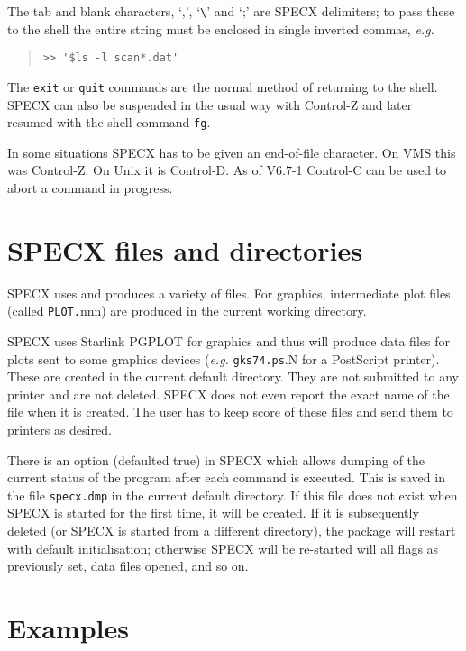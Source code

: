 \documentclass[twoside,11pt]{article}
\renewcommand{\_}{\texttt{\symbol{95}}}
\newenvironment{myquote}{\begin{quote}\begin{small}}{\end{small}\end{quote}}
\begin{document}
The tab and blank characters, `,', `\verb+\+' and `;' are SPECX delimiters;
to pass these to the shell the entire string must be enclosed in single 
inverted commas, {\em e.g.}

\begin{myquote}
\begin{verbatim}
>> '$ls -l scan*.dat'
\end{verbatim}
\end{myquote}

The {\tt exit} or \texttt{quit} commands are the normal method of returning to
the shell.  SPECX can also be suspended in the usual way with Control-Z and
later resumed with the shell command {\tt fg}.

In some situations SPECX has to be given an end-of-file character. On
VMS this was Control-Z. On Unix it is Control-D. As of V6.7-1 Control-C
can be used to abort a command in progress.


\section {SPECX files and directories}

SPECX uses and produces a variety of files. For graphics, 
intermediate plot files (called {\tt PLOT.}nnn) are produced in the
current working directory.

SPECX uses Starlink PGPLOT for graphics and thus will produce data files for
plots sent to some graphics devices ({\em e.g.} {\tt gks74.ps}.N for a
PostScript printer). These are created in the current default directory. They
are not submitted to any printer and are not deleted. SPECX does not even
report the exact name of the file when it is created. The user has to keep
score of these files and send them to printers as desired.

There is an option (defaulted true) in SPECX which allows dumping of the
current status of the program after each command is executed. This is saved in
the file {\tt specx.dmp} in the current default directory. If this file does
not exist when SPECX is started for the first time, it will be created. If it
is subsequently deleted (or SPECX is started from a different directory), the
package will restart with default initialisation; otherwise SPECX will be
re-started will all flags as previously set, data files opened, and so on.


\section {Examples}
\end{document}
